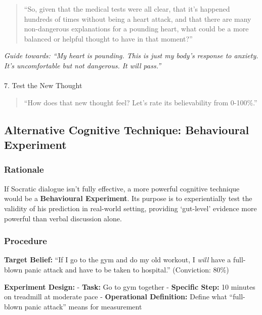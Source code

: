 \documentclass[
  american,
  letterpaper,
  DIV=11,
  numbers=noendperiod]{scrartcl}
\makeatletter
\let\oldparagraph\paragraph
\renewcommand{\paragraph}{
    \@ifstar
      \xxxParagraphStar
      \xxxParagraphNoStar
  }
\newcommand{\xxxParagraphStar}[1]{\oldparagraph*{#1}\mbox{}}
\newcommand{\xxxParagraphNoStar}[1]{\oldparagraph{#1}\mbox{}}
\makeatother
\begin{document}
\begin{quote}
``So, given that the medical tests were all clear, that it's happened
hundreds of times without being a heart attack, and that there are many
non-dangerous explanations for a pounding heart, what could be a more
balanced or helpful thought to have in that moment?''
\end{quote}

\emph{Guide towards: ``My heart is pounding. This is just my body's
response to anxiety. It's uncomfortable but not dangerous. It will
pass.''}

\paragraph{7. Test the New Thought}\label{test-the-new-thought}

\begin{quote}
``How does that new thought feel? Let's rate its believability from
0-100\%.''
\end{quote}

\subsection{Alternative Cognitive Technique: Behavioural
Experiment}\label{alternative-cognitive-technique-behavioural-experiment}

\subsubsection{Rationale}\label{rationale}

If Socratic dialogue isn't fully effective, a more powerful cognitive
technique would be a \textbf{Behavioural Experiment}. Its purpose is to
experientially test the validity of his prediction in real-world
setting, providing `gut-level' evidence more powerful than verbal
discussion alone.

\subsubsection{Procedure}\label{procedure}

\textbf{Target Belief:} ``If I go to the gym and do my old workout, I
\emph{will} have a full-blown panic attack and have to be taken to
hospital.'' (Conviction: 80\%)

\textbf{Experiment Design:} - \textbf{Task:} Go to gym together -
\textbf{Specific Step:} 10 minutes on treadmill at moderate pace -
\textbf{Operational Definition:} Define what ``full-blown panic attack''
means for measurement
\end{document}
